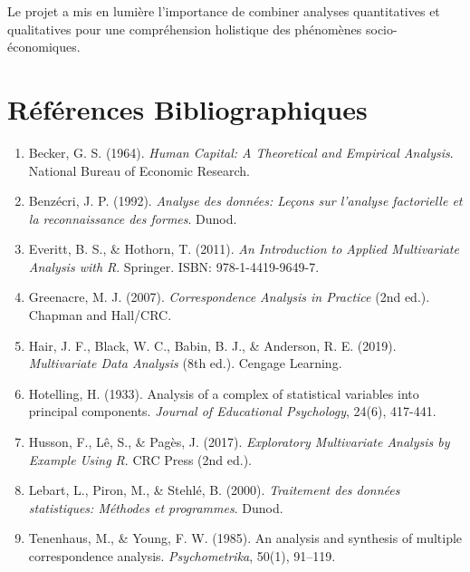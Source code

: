\documentclass[12pt,a4paper]{report}
\begin{document}
Le projet a mis en lumière l'importance de combiner analyses quantitatives et qualitatives pour une compréhension holistique des phénomènes socio-économiques.

\newpage

\section*{Références Bibliographiques}

\begin{enumerate}
    \item Becker, G. S. (1964). \textit{Human Capital: A Theoretical and Empirical Analysis}. National Bureau of Economic Research.
    
    \item Benzécri, J. P. (1992). \textit{Analyse des données: Leçons sur l'analyse factorielle et la reconnaissance des formes}. Dunod.
    
    \item Everitt, B. S., \& Hothorn, T. (2011). \textit{An Introduction to Applied Multivariate Analysis with R}. Springer. ISBN: 978-1-4419-9649-7.
    
    \item Greenacre, M. J. (2007). \textit{Correspondence Analysis in Practice} (2nd ed.). Chapman and Hall/CRC.
    
    \item Hair, J. F., Black, W. C., Babin, B. J., \& Anderson, R. E. (2019). \textit{Multivariate Data Analysis} (8th ed.). Cengage Learning.
    
    \item Hotelling, H. (1933). Analysis of a complex of statistical variables into principal components. \textit{Journal of Educational Psychology}, 24(6), 417-441.
    
    \item Husson, F., Lê, S., \& Pagès, J. (2017). \textit{Exploratory Multivariate Analysis by Example Using R}. CRC Press (2nd ed.).
    
    \item Lebart, L., Piron, M., \& Stehlé, B. (2000). \textit{Traitement des données statistiques: Méthodes et programmes}. Dunod.
    
    \item Tenenhaus, M., \& Young, F. W. (1985). An analysis and synthesis of multiple correspondence analysis. \textit{Psychometrika}, 50(1), 91--119.
\end{enumerate}
\end{document}
